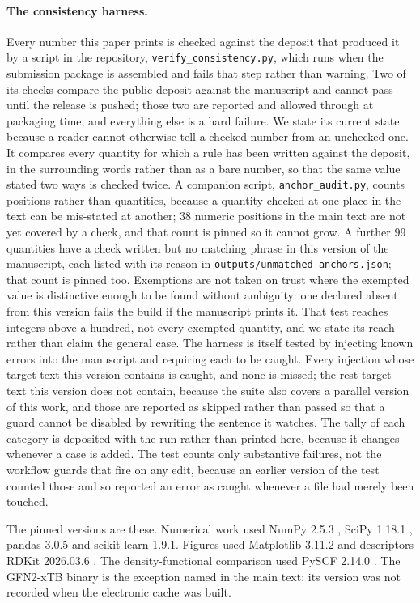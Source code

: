 \documentclass[11pt,a4paper]{article}
\begin{document}
\paragraph{The consistency harness.} Every number this paper prints is checked
against the deposit that produced it by a script in the repository,
\texttt{verify\_consistency.py}, which runs when the submission package is
assembled and fails that step rather than warning. Two of its checks compare
the public deposit against the manuscript and cannot pass until the release is
pushed; those two are reported and allowed through at packaging time, and
everything else is a hard failure. We state its current state because a reader cannot
otherwise tell a checked number from an unchecked one. It compares every
quantity for which a rule has been written against the deposit, in the
surrounding words rather than as a bare number, so that the same value stated
two ways is checked twice. A companion script, \texttt{anchor\_audit.py}, counts positions
rather than quantities, because a quantity checked at one place in the text can
be mis-stated at another; 38 numeric positions in the main text are not yet
covered by a check, and that count is pinned so it cannot grow. A further 99
quantities have a check written but no matching phrase in this version of the
manuscript, each listed with its reason in
\texttt{outputs/unmatched\_anchors.json}; that count is pinned too. Exemptions
are not taken on trust where the exempted value is distinctive enough to be
found without ambiguity: one declared absent from this version fails the build
if the manuscript prints it. That test reaches integers above a hundred, not
every exempted quantity, and we state its reach rather than claim the general
case. The harness is itself tested by injecting
known errors into the manuscript and requiring each to be caught. Every
injection whose target text this version contains is caught, and none is
missed; the rest target text this version does not contain, because the suite
also covers a parallel version of this work, and those are reported as skipped
rather than passed so that a guard cannot be disabled by rewriting the sentence
it watches. The tally of each category is deposited with the run rather than
printed here, because it changes whenever a case is added. The test counts only substantive
failures, not the workflow guards that fire on any edit, because an earlier
version of the test counted those and so reported an error as caught whenever a
file had merely been touched.

The pinned versions are these. Numerical work used NumPy 2.5.3
\cite{numpy2020}, SciPy 1.18.1 \cite{scipy2020}, pandas 3.0.5
\cite{mckinney2010} and scikit-learn 1.9.1. Figures used Matplotlib 3.11.2
\cite{matplotlib2007} and descriptors RDKit 2026.03.6 \cite{rdkit}. The
density-functional comparison used PySCF 2.14.0 \cite{pyscf2020}. The GFN2-xTB binary
is the exception named in the main text: its version was not recorded when the
electronic cache was built.
\end{document}
